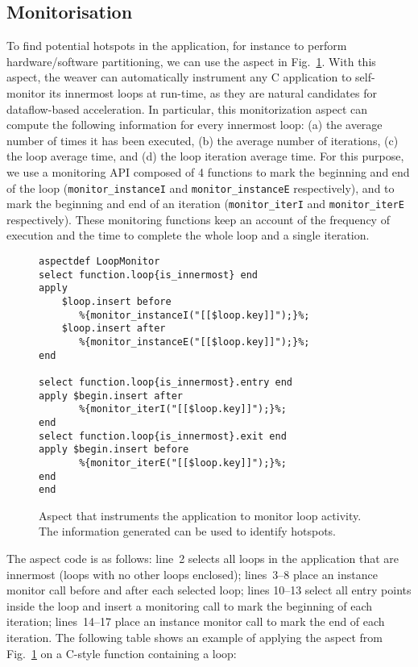 \subsection{Monitorisation}
\label{sect:asp_mon}
To find potential hotspots in the application, for instance to perform
hardware/software partitioning, we can use the aspect in
Fig.~\ref{fig:hotspot}.  With this aspect, the weaver can
automatically instrument any C application to self-monitor its
innermost loops at run-time, as they are natural candidates for
dataflow-based acceleration. In particular, this monitorization aspect
can compute the following information for every innermost loop: (a)
the average number of times it has been executed, (b) the average
number of iterations, (c) the loop average time, and (d) the loop
iteration average time. For this purpose, we use a monitoring API
composed of 4 functions to mark the beginning and end of the loop
(\texttt{monitor\_instanceI} and \texttt{monitor\_instanceE}
respectively), and to mark the beginning and end of an iteration
(\texttt{monitor\_iterI} and \texttt{monitor\_iterE}
respectively). These monitoring functions keep an account of the
frequency of execution and the time to complete the whole loop and a
single iteration.

\lstset{style=lara}
\begin{figure}[!h]
\begin{lstlisting}
aspectdef LoopMonitor
select function.loop{is_innermost} end
apply
    $loop.insert before
       %{monitor_instanceI("[[$loop.key]]");}%;
    $loop.insert after
       %{monitor_instanceE("[[$loop.key]]");}%;
end

select function.loop{is_innermost}.entry end
apply $begin.insert after
       %{monitor_iterI("[[$loop.key]]");}%;
end
select function.loop{is_innermost}.exit end
apply $begin.insert before
       %{monitor_iterE("[[$loop.key]]");}%;
end
end
\end{lstlisting}
\caption{Aspect that instruments the application to monitor loop
  activity. The information generated can be used to identify
  hotspots.}
\label{fig:hotspot}
\end{figure}

  The aspect code is as follows: line~2 selects all
loops in the application that are innermost (loops with no other loops
enclosed); lines~3--8 place an instance monitor call before and after
each selected loop; lines 10--13 select all entry points inside the
loop and insert a monitoring call to mark the beginning of each
iteration; lines~14--17 place an instance monitor call to mark the end
of each iteration. The following table shows an example of applying
the aspect from Fig.~\ref{fig:hotspot} on a C-style function containing a loop:
\vspace{2mm}

